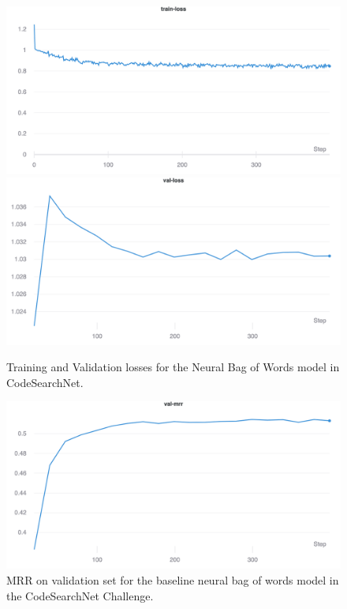 \documentclass{article}
\begin{document}
\begin{figure}[!ht]
    \centering
    \includegraphics[scale=0.16]{figures/neuralbow/train-loss.png}
    \includegraphics[scale=0.16]{figures/neuralbow/val-loss.png}
    \caption{Training and Validation losses for the Neural Bag of Words model in CodeSearchNet.}
    \label{fig:train_valid_neural_bow_model}
\end{figure}

\begin{figure}[!ht]
    \centering
    \includegraphics[scale=0.3]{figures/neuralbow/val-mrr.png}
    \caption{MRR on validation set for the baseline neural bag of words model in the CodeSearchNet Challenge.}
    \label{fig:val_mrr_neuralbow}
\end{figure}
\end{document}
